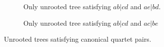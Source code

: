 \documentclass[runningheads]{llncs}
\begin{document}








\begin{figure}[h]
    \centering
    \begin{subfigure}{0.35\textwidth}
        \centering
        \caption{Only unrooted tree satisfying $ab|cd$ and $ae|bd$.}
        \label{fig:unrooted_tree_1}
    \end{subfigure}
    \hfill 
    \centering
    \begin{subfigure}{0.35\textwidth}
        \centering
        \caption{Only unrooted tree satisfying $ab|cd$ and $ac|be$}
        \label{fig:unrooted_tree_2}
    \end{subfigure}
    \caption{Unrooted trees satisfying canonical quartet pairs.}
 
\end{figure}
\end{document}
